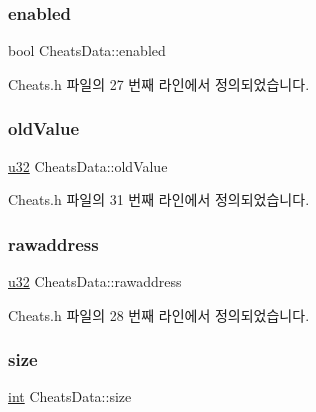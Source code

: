 \mbox{\label{struct_cheats_data_a99c72fc2074645888a5afe88cfb0fd15}} 
\subsubsection{\texorpdfstring{enabled}{enabled}}
{\footnotesize\ttfamily bool Cheats\+Data\+::enabled}



Cheats.\+h 파일의 27 번째 라인에서 정의되었습니다.

\mbox{\label{struct_cheats_data_ae53ec4ba23eb94b339cc05b807a944d5}} 
\subsubsection{\texorpdfstring{old\+Value}{oldValue}}
{\footnotesize\ttfamily \mbox{\hyperlink{_system_8h_a10e94b422ef0c20dcdec20d31a1f5049}{u32}} Cheats\+Data\+::old\+Value}



Cheats.\+h 파일의 31 번째 라인에서 정의되었습니다.

\mbox{\label{struct_cheats_data_aa12c1d606385a21c544022d5acb9c95e}} 
\subsubsection{\texorpdfstring{rawaddress}{rawaddress}}
{\footnotesize\ttfamily \mbox{\hyperlink{_system_8h_a10e94b422ef0c20dcdec20d31a1f5049}{u32}} Cheats\+Data\+::rawaddress}



Cheats.\+h 파일의 28 번째 라인에서 정의되었습니다.

\mbox{\label{struct_cheats_data_a2e3e50db1415e980fe34da90fdbda02a}} 
\subsubsection{\texorpdfstring{size}{size}}
{\footnotesize\ttfamily \mbox{\hyperlink{_util_8cpp_a0ef32aa8672df19503a49fab2d0c8071}{int}} Cheats\+Data\+::size}



